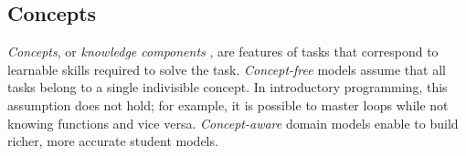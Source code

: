 %
%


\subsection{Concepts}

\emph{Concepts}, or \emph{knowledge components} \cite{knowledge-components},
are features of tasks that correspond to learnable skills %
required to solve the task.
\emph{Concept-free} models assume that all
tasks belong to a single indivisible concept.
In introductory programming, this assumption does not hold;
for example, it is possible to master loops while not knowing functions
and vice versa.
\emph{Concept-aware} domain models
enable to build richer, more accurate student models.

